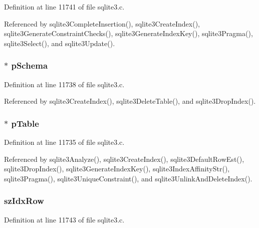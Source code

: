 Definition at line 11741 of file sqlite3.\+c.



Referenced by sqlite3\+Complete\+Insertion(), sqlite3\+Create\+Index(), sqlite3\+Generate\+Constraint\+Checks(), sqlite3\+Generate\+Index\+Key(), sqlite3\+Pragma(), sqlite3\+Select(), and sqlite3\+Update().

\hypertarget{struct_index_ac262c2ca980f0326edbe82bbe7fda205}{}
\subsubsection[{p\+Schema}]{$\ast$ p\+Schema}\label{struct_index_ac262c2ca980f0326edbe82bbe7fda205}


Definition at line 11738 of file sqlite3.\+c.



Referenced by sqlite3\+Create\+Index(), sqlite3\+Delete\+Table(), and sqlite3\+Drop\+Index().

\hypertarget{struct_index_a588ce43da42d3ce58d9ac3c5c2c6c4d4}{}
\subsubsection[{p\+Table}]{$\ast$ p\+Table}\label{struct_index_a588ce43da42d3ce58d9ac3c5c2c6c4d4}


Definition at line 11735 of file sqlite3.\+c.



Referenced by sqlite3\+Analyze(), sqlite3\+Create\+Index(), sqlite3\+Default\+Row\+Est(), sqlite3\+Drop\+Index(), sqlite3\+Generate\+Index\+Key(), sqlite3\+Index\+Affinity\+Str(), sqlite3\+Pragma(), sqlite3\+Unique\+Constraint(), and sqlite3\+Unlink\+And\+Delete\+Index().

\hypertarget{struct_index_af692ae2e419556548771cb3d1ec2b058}{}
\subsubsection[{sz\+Idx\+Row}]{ sz\+Idx\+Row}\label{struct_index_af692ae2e419556548771cb3d1ec2b058}


Definition at line 11743 of file sqlite3.\+c.



